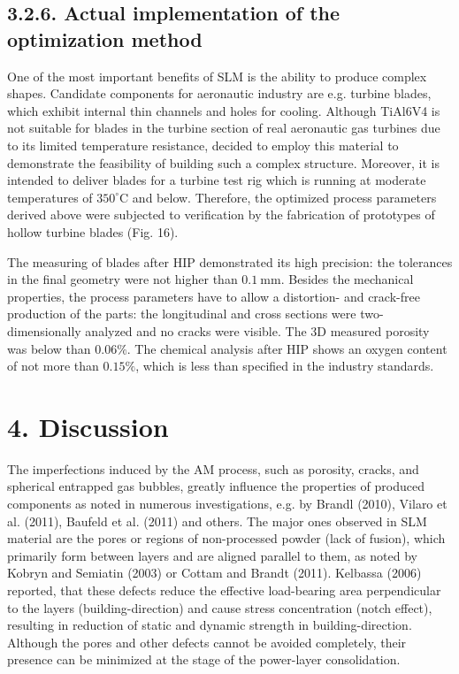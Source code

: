 \documentclass[10pt]{article}
\begin{document}
\subsection*{3.2.6. Actual implementation of the optimization method}
One of the most important benefits of SLM is the ability to produce complex shapes. Candidate components for aeronautic industry are e.g. turbine blades, which exhibit internal thin channels and holes for cooling. Although TiAl6V4 is not suitable for blades in the turbine section of real aeronautic gas turbines due to its limited temperature resistance, decided to employ this material to demonstrate the feasibility of building such a complex structure. Moreover, it is intended to deliver blades for a turbine test rig which is running at moderate temperatures of $350^{\circ} \mathrm{C}$ and below. Therefore, the optimized process parameters derived above were subjected to verification by the fabrication of prototypes of hollow turbine blades (Fig. 16).

The measuring of blades after HIP demonstrated its high precision: the tolerances in the final geometry were not higher than $0.1 \mathrm{~mm}$. Besides the mechanical properties, the process parameters have to allow a distortion- and crack-free production of the parts: the longitudinal and cross sections were two-dimensionally analyzed and no cracks were visible. The 3D measured porosity was below than $0.06 \%$. The chemical analysis after HIP shows an oxygen content of not more than $0.15 \%$, which is less than specified in the industry standards.

\section*{4. Discussion}
The imperfections induced by the AM process, such as porosity, cracks, and spherical entrapped gas bubbles, greatly influence the properties of produced components as noted in numerous investigations, e.g. by Brandl (2010), Vilaro et al. (2011), Baufeld et al. (2011) and others. The major ones observed in SLM material are the pores or regions of non-processed powder (lack of fusion), which primarily form between layers and are aligned parallel to them, as noted by Kobryn and Semiatin (2003) or Cottam and Brandt (2011). Kelbassa (2006) reported, that these defects reduce the effective load-bearing area perpendicular to the layers (building-direction) and cause stress concentration (notch effect), resulting in reduction of static and dynamic strength in building-direction. Although the pores and other defects cannot be avoided completely, their presence can be minimized at the stage of the power-layer consolidation.
\end{document}
